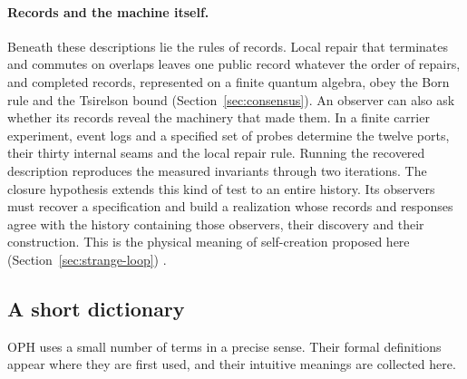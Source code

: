 \documentclass[11pt]{article}
\theoremstyle{definition}
\theoremstyle{remark}
\begin{document}
\paragraph{Records and the machine itself.} Beneath these descriptions
lie the rules of records. Local repair that terminates and commutes on
overlaps leaves one public record whatever the order of repairs, and
completed records, represented on a finite quantum algebra, obey the Born
rule and the Tsirelson bound
(Section~\ref{sec:consensus}). An observer can also ask whether its
records reveal the machinery that made them. In a finite carrier
experiment, event logs and a specified set of probes determine the
twelve ports, their thirty internal seams and the local repair rule.
Running the recovered description reproduces the measured invariants
through two iterations. The closure hypothesis extends this kind of test
to an entire history. Its observers must recover a specification and
build a realization whose records and responses agree with the history
containing those observers, their discovery and their construction.
This is the physical meaning of self-creation proposed here
(Section~\ref{sec:strange-loop}) \cite{ophsim}.

\subsection{A short dictionary}
\label{sec:dictionary}

OPH uses a small number of terms in a precise sense. Their formal
definitions appear where they are first used, and their intuitive
meanings are collected here.
\end{document}
